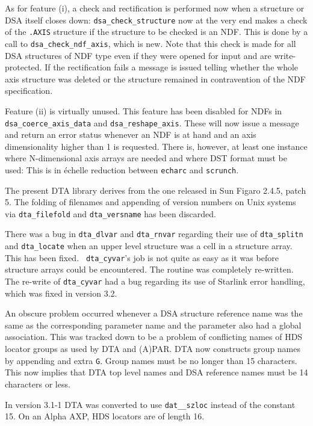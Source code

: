 As for feature (i), a check and rectification is performed now when a
structure or DSA itself closes down: {\tt dsa\_check\_structure} now at the
very end makes a check of the {\tt .AXIS} structure if the structure to
be checked is an NDF. This is done by a call to {\tt dsa\_check\_ndf\_axis},
which is new. Note that this check is made for all DSA structures of NDF
type even if they were opened for input and are write-protected. If the
rectification fails a message is issued telling whether the whole axis
structure was deleted or the structure remained in contravention of the
NDF specification.

Feature (ii) is virtually unused. This feature has been disabled for
NDFs in {\tt dsa\_coerce\_axis\-\_data} and {\tt dsa\_reshape\_axis}.
These will now issue a message and return an error status whenever an
NDF is at hand and an axis dimensionality higher than 1 is requested.
There is, however, at least one instance where N-dimensional axis arrays
are needed and where DST format must be used: This is in \'echelle
reduction between {\tt echarc} and {\tt scrunch}.

The present DTA library derives from the one released in Sun Figaro
2.4.5, patch 5.
The folding of filenames and appending of version numbers on Unix
systems via {\tt dta\_filefold} and {\tt dta\_versname} has been discarded.

There was a bug in {\tt dta\_dlvar} and {\tt dta\_rnvar} regarding their
use of {\tt dta\_splitn} and {\tt dta\_loc\-ate} when an upper level
structure was a cell in a structure array.  This has been fixed.  {\tt
dta\_cyvar}'s job is not quite as easy as it was before structure arrays
could be encountered.  The routine was completely re-written.  The
re-write of {\tt dta\_cyvar} had a bug regarding its use of Starlink
error handling, which was fixed in version 3.2.

An obscure problem occurred whenever a DSA structure reference name was
the same as the corresponding parameter name and the parameter also had
a global association. This was tracked down to be a problem of
conflicting names of HDS locator groups as used by DTA and (A)PAR. DTA
now constructs group names by appending and extra {\tt G}. Group names
must be no longer than 15 characters. This now implies that DTA top
level names and DSA reference names must be 14 characters or less.

In version 3.1-1 DTA was converted to use {\tt dat\_\_szloc} instead of the
constant 15.  On an Alpha AXP, HDS locators are of length 16.

